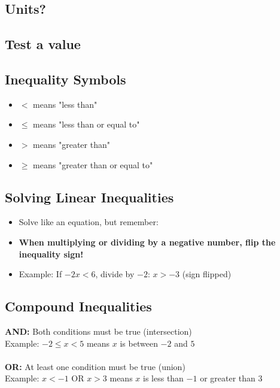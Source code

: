 \documentclass[12pt]{article}
\begin{document}
        \subsection*{Units?}
        
        \subsection*{Test a value}

        \subsection*{Inequality Symbols}
            \begin{itemize}
                \item $<$ means "less than"
                \item $\leq$ means "less than or equal to"
                \item $>$ means "greater than"
                \item $\geq$ means "greater than or equal to"
            \end{itemize}

	    \subsection*{Solving Linear Inequalities}
        	\begin{itemize}
            	\item Solve like an equation, but remember:
                \item \textbf{When multiplying or dividing by a negative number, flip the inequality sign!}
                \item Example: If $-2x < 6$, divide by $-2$: $x > -3$ (sign flipped)
            \end{itemize}
	
	    \subsection*{Compound Inequalities}
        	\textbf{AND:} Both conditions must be true (intersection)\\
            Example: $-2 \leq x < 5$ means $x$ is between $-2$ and $5$\\\\
            \textbf{OR:} At least one condition must be true (union)\\
            Example: $x < -1$ OR $x > 3$ means $x$ is less than $-1$ or greater than $3$
\end{document}
